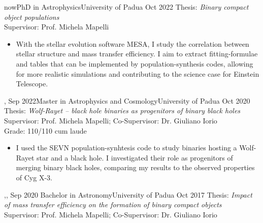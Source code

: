 %
%
%
\begin{experiences}
  \experiencetags
    {now}{PhD in Astrophysics}{University of Padua}
    {Oct 2022}
    {Thesis: \textit{Binary compact object populations} \\
    Supervisor: Prof. Michela Mapelli  }{
    \begin{itemize}
        \item  With the stellar evolution software MESA, I study the correlation between stellar structure and mass transfer efficiency. I aim to extract fitting-formulae and tables that can be implemented by population-synthesis codes, allowing for more realistic simulations and contributing to the science case for Einstein Telescope.
    \end{itemize}
   }{,}
  \emptySeparator
  \experiencetags
    {Sep 2022}{Master in Astrophysics and Cosmology}{University of Padua}
    {Oct 2020} 
    {Thesis: \textit{Wolf-Rayet -- black hole binaries as progenitors of binary black holes} \\
    Supervisor: Prof. Michela Mapelli; Co-Supervisor: Dr. Giuliano Iorio \\
    Grade: 110/110 cum laude %
    }{
    \begin{itemize}
        \item I used the SEVN population-synhtesis code to study binaries hosting a Wolf-Rayet star and a black hole. I investigated their role as progenitors of merging binary black holes, comparing my results to the observed properties of Cyg X-3. 
    \end{itemize}
    }{,,}
  \emptySeparator
  \experiencetags
    {Sep 2020}   {Bachelor in Astronomy}{University of Padua}
    {Oct 2017} 
    {Thesis: \textit{Impact of mass transfer efficiency on the formation of binary compact objects} \\
    Supervisor: Prof. Michela Mapelli; Co-Supervisor: Dr. Giuliano Iorio \\
}
\end{experiences}
